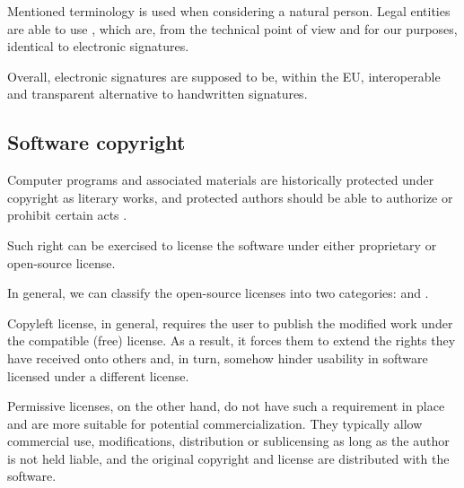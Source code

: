 \documentclass[thesismargins, english, thesislinespacing, onelinechapterstyle, upjsfrontpage]{rnthesis}
\begin{document}
Mentioned terminology is used when considering a natural person. Legal entities are able to use , which are, from the technical point of view and for our purposes, identical to electronic signatures.

Overall, electronic signatures are supposed to be, within the EU, interoperable and transparent alternative to handwritten signatures.

\subsection{Software copyright} \label{copyright}

Computer programs and associated materials are historically protected under copyright as literary works, and protected authors should be able to authorize or prohibit certain acts \cite{eeccopyright}.

Such right can be exercised to license the software under either proprietary or open-source license.
\iffalse %
Proprietary meaning under the exclusive legal right of the author, typically also confidential and distributed as a paid product.
Open-source meaning having its source code freely available, typically also distributed for free and without any liability (the software is provided "as is").

Motivation to license the software under an open-source license can differ, and so do such licenses.
While a proprietary license is usually made specifically for that entity and its interests, open-source licenses tend to be reused between different authors.
This means that consumers of the software can quickly recognize their rights and responsibilities if they decide to use, modify, or distribute the software.
\fi
In general, we can classify the open-source licenses into two categories:  and .

Copyleft license, in general, requires the user to publish the modified work under the compatible (free) license.
As a result, it forces them to extend the rights they have received onto others and, in turn, somehow hinder usability in software licensed under a different license.
\iffalse %
A popular example of such license is the GNU General Public License(GPL) and its derivatives like GNU Lesser GPL (LGPL) or GNU Affero GPL (AGPL).
\fi

Permissive licenses, on the other hand, do not have such a requirement in place and are more suitable for potential commercialization.
They typically allow commercial use, modifications, distribution or sublicensing as long as the author is not held liable, and the original copyright and license are distributed with the software.
\iffalse %
Often used permissive licenses are MIT License, Apache License, or BSD License.
\fi
\end{document}

